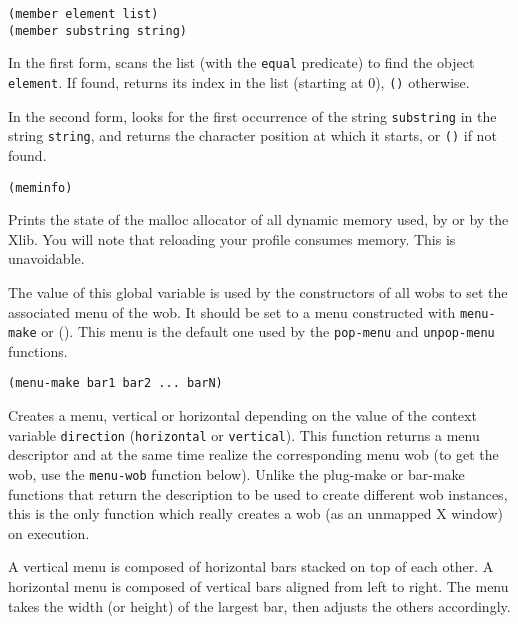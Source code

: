 
{\usagefont\begin{verbatim}
(member element list)
(member substring string)
\end{verbatim}}\usageupspace

In the first form, scans the list (with the \verb"equal" predicate) to find
the object \verb"element". If found, returns its index in the list (starting
at 0), \verb"()" otherwise.

In the second form, looks for the first occurrence of the string
\verb"substring" in the string \verb"string", and returns the character
position at which it starts, or \verb"()" if not found.

        
{\usagefont\begin{verbatim}
(meminfo)
\end{verbatim}}\usageupspace

Prints the state of the malloc allocator of all dynamic memory used, by
{\WOOL} or by the Xlib. You will note that reloading your profile consumes
memory.  This is unavoidable.

        

The value of this global variable is used by the constructors of all wobs to
set the associated menu of the wob.  It should be set to a menu constructed
with \verb"menu-make" or ().  This menu is the default one used by the
\verb"pop-menu" and \verb"unpop-menu" functions.

        
{\usagefont\begin{verbatim}
(menu-make bar1 bar2 ... barN)
\end{verbatim}}\usageupspace

Creates a menu, vertical or horizontal depending on the value of the context
variable \verb"direction" ({\tt horizontal} or {\tt vertical}). This
function returns a menu descriptor and at the same time realize the
corresponding menu wob (to get the
wob, use the \verb"menu-wob" function below). Unlike the plug-make or
bar-make functions that return the {\WOOL} description to be used to create
different wob instances, this is the only {\WOOL} function which really
creates a wob (as an unmapped X window) on execution.

A vertical menu is composed of horizontal bars stacked on top of each other.
A horizontal menu is composed of vertical bars aligned from left to right.
The menu takes the width (or height) of the largest bar, then adjusts the
others accordingly. 

